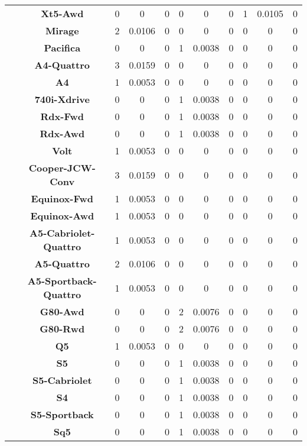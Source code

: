 \begin{center}
\begin{tabular}{|c|c||@{\hspace{1ex}}||c|c|c||@{\hspace{1ex}}||c|c|c||@{\hspace{1ex}}||c|c|c||@{\hspace{1ex}}||}
\cline{2-11}
  & {\bf Xt5-Awd} & 0 & 0 & 0 & 0 & 0 & 0 & 1 & 0.0105 & 0 \\
\cline{2-11}
  & {\bf Mirage} & 2 & 0.0106 & 0 & 0 & 0 & 0 & 0 & 0 & 0 \\
\cline{2-11}
  & {\bf Pacifica} & 0 & 0 & 0 & 1 & 0.0038 & 0 & 0 & 0 & 0 \\
\cline{2-11}
  & {\bf A4-Quattro} & 3 & 0.0159 & 0 & 0 & 0 & 0 & 0 & 0 & 0 \\
\cline{2-11}
  & {\bf A4} & 1 & 0.0053 & 0 & 0 & 0 & 0 & 0 & 0 & 0 \\
\cline{2-11}
  & {\bf 740i-Xdrive} & 0 & 0 & 0 & 1 & 0.0038 & 0 & 0 & 0 & 0 \\
\cline{2-11}
  & {\bf Rdx-Fwd} & 0 & 0 & 0 & 1 & 0.0038 & 0 & 0 & 0 & 0 \\
\cline{2-11}
  & {\bf Rdx-Awd} & 0 & 0 & 0 & 1 & 0.0038 & 0 & 0 & 0 & 0 \\
\cline{2-11}
  & {\bf Volt} & 1 & 0.0053 & 0 & 0 & 0 & 0 & 0 & 0 & 0 \\
\cline{2-11}
  & {\bf Cooper-JCW-Conv} & 3 & 0.0159 & 0 & 0 & 0 & 0 & 0 & 0 & 0 \\
\cline{2-11}
  & {\bf Equinox-Fwd} & 1 & 0.0053 & 0 & 0 & 0 & 0 & 0 & 0 & 0 \\
\cline{2-11}
  & {\bf Equinox-Awd} & 1 & 0.0053 & 0 & 0 & 0 & 0 & 0 & 0 & 0 \\
\cline{2-11}
  & {\bf A5-Cabriolet-Quattro} & 1 & 0.0053 & 0 & 0 & 0 & 0 & 0 & 0 & 0 \\
\cline{2-11}
  & {\bf A5-Quattro} & 2 & 0.0106 & 0 & 0 & 0 & 0 & 0 & 0 & 0 \\
\cline{2-11}
  & {\bf A5-Sportback-Quattro} & 1 & 0.0053 & 0 & 0 & 0 & 0 & 0 & 0 & 0 \\
\cline{2-11}
  & {\bf G80-Awd} & 0 & 0 & 0 & 2 & 0.0076 & 0 & 0 & 0 & 0 \\
\cline{2-11}
  & {\bf G80-Rwd} & 0 & 0 & 0 & 2 & 0.0076 & 0 & 0 & 0 & 0 \\
\cline{2-11}
  & {\bf Q5} & 1 & 0.0053 & 0 & 0 & 0 & 0 & 0 & 0 & 0 \\
\cline{2-11}
  & {\bf S5} & 0 & 0 & 0 & 1 & 0.0038 & 0 & 0 & 0 & 0 \\
\cline{2-11}
  & {\bf S5-Cabriolet} & 0 & 0 & 0 & 1 & 0.0038 & 0 & 0 & 0 & 0 \\
\cline{2-11}
  & {\bf S4} & 0 & 0 & 0 & 1 & 0.0038 & 0 & 0 & 0 & 0 \\
\cline{2-11}
  & {\bf S5-Sportback} & 0 & 0 & 0 & 1 & 0.0038 & 0 & 0 & 0 & 0 \\
\cline{2-11}
  & {\bf Sq5} & 0 & 0 & 0 & 1 & 0.0038 & 0 & 0 & 0 & 0 \\

\end{tabular}
\end{center}
